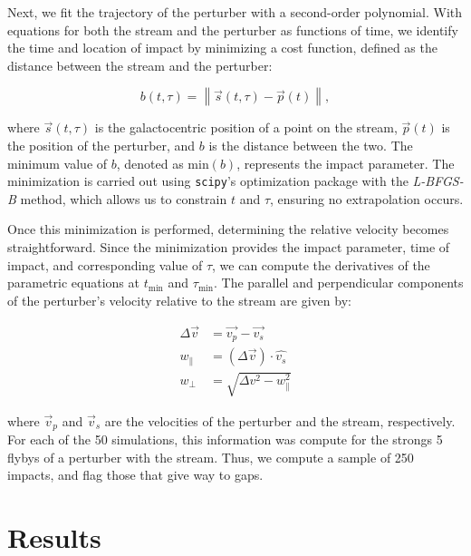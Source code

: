 \documentclass[]{aa}
\begin{document}
    Next, we fit the trajectory of the perturber with a second-order polynomial. With equations for both the stream and the perturber as functions of time, we identify the time and location of impact by minimizing a cost function, defined as the distance between the stream and the perturber:

    \begin{equation} b(t, \tau) = \left\lVert \vec{s}(t, \tau) - \vec{p}(t) \right\rVert, \end{equation}

    where $\vec{s}(t, \tau)$ is the galactocentric position of a point on the stream, $\vec{p}(t)$ is the position of the perturber, and $b$ is the distance between the two. The minimum value of $b$, denoted as $\text{min}(b)$, represents the impact parameter. The minimization is carried out using \texttt{scipy}'s optimization package with the \textit{L-BFGS-B} method, which allows us to constrain $t$ and $\tau$, ensuring no extrapolation occurs.

    Once this minimization is performed, determining the relative velocity becomes straightforward. Since the minimization provides the impact parameter, time of impact, and corresponding value of $\tau$, we can compute the derivatives of the parametric equations at $t_{\text{min}}$ and $\tau_{\text{min}}$. The parallel and perpendicular components of the perturber's velocity relative to the stream are given by:

    \begin{align}
      \Delta \vec{v} &=\vec{v_p} - \vec{v_s} \\
      w_\parallel &= \left(\Delta \vec{v}\right)\cdot \hat{v_s}\\  
      w_\perp &=  \sqrt{\Delta v ^2 - w_\parallel ^ 2}
      \end{align}


    where $\vec{v}_p$ and $\vec{v}_s$ are the velocities of the perturber and the stream, respectively. For each of the 50 simulations, this information was compute for the strongs 5 flybys of a perturber with the stream. Thus, we compute a sample of 250 impacts, and flag those that give way to gaps. 


\section{Results}
\end{document}
